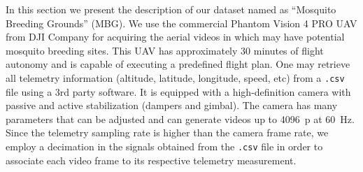 %
In this section we present the description of our dataset named as ``Mosquito Breeding Grounds'' (MBG). 
We use the commercial Phantom Vision 4 PRO UAV from DJI Company for acquiring the aerial videos in which may have potential mosquito breeding sites.
%
This UAV has approximately 30 minutes of flight autonomy and is capable of executing a predefined flight plan.
One may retrieve all telemetry information (\eg altitude, latitude, longitude, speed, etc) from a \verb|.csv| file using a 3rd party software.
It is equipped with a high-definition camera with passive and active stabilization (dampers and gimbal).
%
The camera has many parameters that can be adjusted and can generate videos up to 4096~p at 60~Hz.
%
Since the telemetry sampling rate is higher than the camera frame rate, we employ a decimation in the signals obtained from the \verb|.csv| file in order to associate each video frame to its respective telemetry measurement.
%

